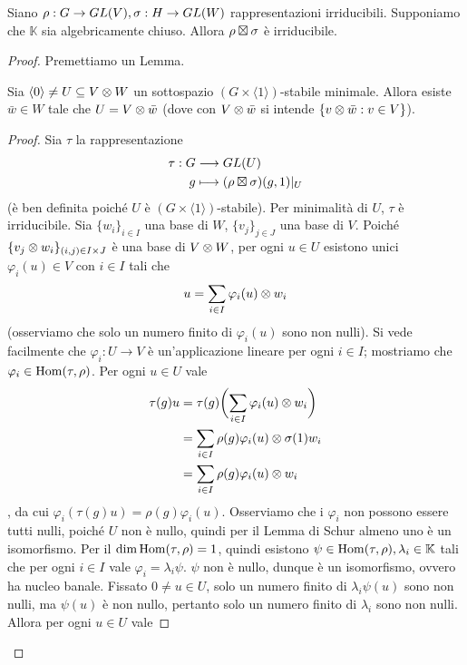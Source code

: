 \begin{proposition}
Siano $\rho:G\to GL(V),\allowbreak\sigma:H\to GL(W)$ rappresentazioni irriducibili. Supponiamo che $\mathbb{K}$ sia algebricamente chiuso. Allora $\rho\boxtimes\sigma$ è irriducibile.
\end{proposition}
\begin{proof}
Premettiamo un Lemma.
\begin{lemma*}
Sia $\langle0\rangle\neq U\subseteq V\otimes W$ un sottospazio $(G\times\langle1\rangle)$-stabile minimale. Allora esiste $\bar{w}\in W$ tale che $U=V\otimes\bar{w}$ (dove con $V\otimes\bar{w}$ si intende $\{v\otimes\bar{w}:v\in V\}$).
\end{lemma*}
\begin{proof}
Sia $\tau$ la rappresentazione
\begin{align*}
\tau:G&\longrightarrow GL(U)\\
g&\longmapsto (\rho\boxtimes\sigma)(g,1)|_U
\end{align*}
(è ben definita poiché $U$ è $(G\times\langle1\rangle)$-stabile). Per minimalità di $U$, $\tau$ è irriducibile. Sia $\{w_i\}_{i\in I}$ una base di $W$, $\{v_j\}_{j\in J}$ una base di $V$. Poiché $\{v_j\otimes w_i\}_{(i,j)\in I\times J}$ è una base di $V\otimes W$, per ogni $u\in U$ esistono unici $\varphi_i(u)\in V$ con $i\in I$ tali che
$$
u=\sum_{i\in I}\varphi_i(u)\otimes w_i
$$
(osserviamo che solo un numero finito di $\varphi_i(u)$ sono non nulli). Si vede facilmente che $\varphi_i:U\to V$ è un'applicazione lineare per ogni $i\in I$; mostriamo che $\varphi_i\in\operatorname{Hom}(\tau,\rho)$. Per ogni $u\in U$ vale
\begin{align*}
\tau(g)u&=\tau(g)\biggl(\sum_{i\in I}\varphi_i(u)\otimes w_i\biggr)\\
&=\sum_{i\in I}\rho(g)\varphi_i(u)\otimes\sigma(1)w_i\\
&=\sum_{i\in I}\rho(g)\varphi_i(u)\otimes w_i
\end{align*}
, da cui $\varphi_i(\tau(g)u)=\rho(g)\varphi_i(u)$. Osserviamo che i $\varphi_i$ non possono essere tutti nulli, poiché $U$ non è nullo, quindi per il Lemma di Schur almeno uno è un isomorfismo. Per il  $\dim\operatorname{Hom}(\tau,\rho)=1$, quindi esistono $\psi\in\operatorname{Hom}(\tau,\rho),\allowbreak\lambda_i\in\mathbb{K}$ tali che per ogni $i\in I$ vale $\varphi_i=\lambda_i\psi$. $\psi$ non è nullo, dunque è un isomorfismo, ovvero ha nucleo banale. Fissato $0\neq u\in U$, solo un numero finito di $\lambda_i\psi(u)$ sono non nulli, ma $\psi(u)$ è non nullo, pertanto solo un numero finito di $\lambda_i$ sono non nulli. Allora per ogni $u\in U$ vale

\end{proof}
\end{proof}
